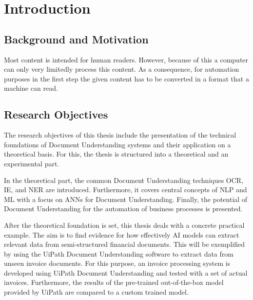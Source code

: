 \chapter{Introduction}

\section{Background and Motivation}

Most content is intended for human readers. However, because of this a computer can only very limitedly process this content. As a consequence, for automation purposes in the first step the given content has to be converted in a format that a machine can read.

\section{Research Objectives}




The research objectives of this thesis include the presentation of the technical foundations of Document Understanding systems and their application on a theoretical basis. For this, the thesis is structured into a theoretical and an experimental part.

In the theoretical part, the common Document Understanding techniques \ac{OCR}, \ac{IE}, and \ac{NER} are introduced. 
Furthermore, it covers central concepts of \ac{NLP} and \ac{ML} with a focus on \acp{ANN} for Document Understanding. 
Finally, the potential of Document Understanding for the automation of business processes is presented.

After the theoretical foundation is set, this thesis deals with a concrete practical example. The aim is to find evidence for how effectively AI models can extract relevant data from semi-structured financial documents. This will be exemplified by using the UiPath Document Understanding software to extract data from unseen invoice documents.
For this purpose, an invoice processing system is developed using UiPath Document Understanding and tested with a set of actual invoices. Furthermore, the results of the pre-trained out-of-the-box model provided by UiPath are compared to a custom trained model.  